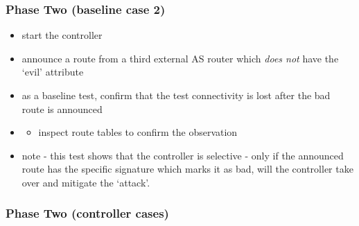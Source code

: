 \subsubsection{Phase Two (baseline case 2)}

\begin{itemize}
    \item start the \hbgp controller
    \item announce a route from a third external AS router which \textit{does not} have the `evil' attribute
    \item as a baseline test, confirm that the test connectivity is lost after the bad route is announced
    \item \begin{itemize}
        \item inspect route tables to confirm the observation
    \end{itemize}
    \item note - this test shows that the controller is selective - only if the announced route has the specific signature which marks it as bad, will the controller take over and mitigate the `attack'.
\end{itemize}

\subsubsection{Phase Two (controller cases)}

